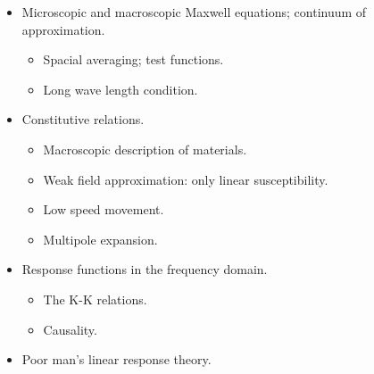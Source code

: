 \documentclass[hyperref, a4paper]{article}
\begin{document}
\begin{itemize}
    \item Microscopic and macroscopic Maxwell equations; continuum of approximation.
    \begin{itemize}
        \item Spacial averaging; test functions.
        \item Long wave length condition.
    \end{itemize}
    \item Constitutive relations.
    \begin{itemize}
        \item Macroscopic description of materials.
        \item Weak field approximation: only linear susceptibility.
        \item Low speed movement.
        \item Multipole expansion.
    \end{itemize}
    \item Response functions in the frequency domain.
    \begin{itemize}
        \item The K-K relations.
        \item Causality.
    \end{itemize}
    \item Poor man's linear response theory.
\end{itemize}
\end{document}
